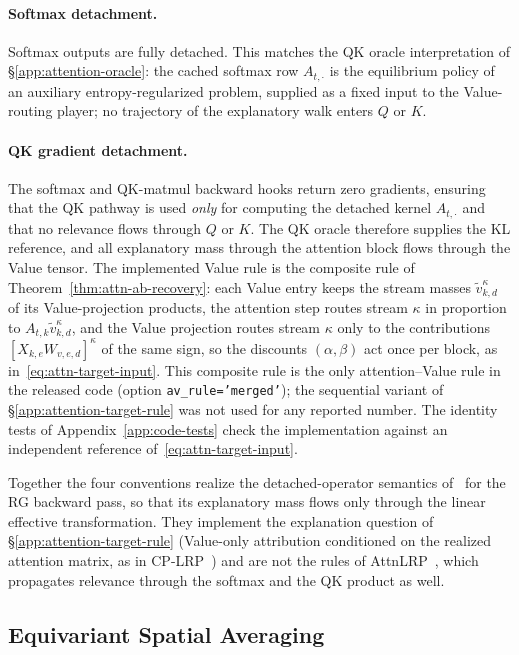 \documentclass[twoside]{article}
\newif\ifch \chfalse
\newcommand{\ch}[1]{\ifch\textcolor{magenta}{#1}\else#1\fi}
\newcommand{\1}{\mathbf{1}}
\begin{document}
\paragraph{Softmax detachment.}
Softmax outputs are fully detached. This matches the QK oracle interpretation of
\S\ref{app:attention-oracle}: the cached softmax row $A_{t,\cdot}$ is the equilibrium policy of an
auxiliary entropy-regularized problem, supplied as a fixed input to the Value-routing player; no
trajectory of the explanatory walk enters $Q$ or $K$.

\paragraph{QK gradient detachment.}\label{app:attention-grad-detach}
The softmax and QK-matmul backward hooks return zero gradients, ensuring that the QK pathway is
used \emph{only} for computing the detached kernel $A_{t,\cdot}$ and that no relevance flows
through $Q$ or $K$. The QK oracle therefore supplies the KL reference, and all explanatory mass
through the attention block flows through the Value tensor. The implemented Value rule is the
composite rule of Theorem~\ref{thm:attn-ab-recovery}: each Value entry keeps the stream masses
$\tilde v^\kappa_{k,d}$ of its Value-projection products, the attention step routes stream $\kappa$
in proportion to $A_{t,k}\tilde v^\kappa_{k,d}$, and the Value projection routes stream $\kappa$
only to the contributions $[X_{k,e}W_{v,e,d}]^\kappa$ of the same sign, so the discounts
$(\alpha,\beta)$ act once per block, as in~\eqref{eq:attn-target-input}. \ch{This composite rule is the
only attention--Value rule in the released code (option \texttt{av\_rule='merged'}); the sequential
variant of \S\ref{app:attention-target-rule} was not used for any reported number. The identity
tests of Appendix~\ref{app:code-tests} check the implementation against an independent reference
of~\eqref{eq:attn-target-input}.}

\ch{Together the four conventions realize the detached-operator semantics of~\citet{Wrobel2024} for the
\ac{RG} backward pass, so that its explanatory mass flows only through the linear effective
transformation. They implement the explanation question of \S\ref{app:attention-target-rule}
(Value-only attribution conditioned on the realized attention matrix, as in
CP-LRP~\citep{Ali2022}) and are not the rules of AttnLRP~\citep{achtibat2024attnlrp}, which
propagates relevance through the softmax and the QK product as well.}

\subsection{Equivariant Spatial Averaging}\label{app:equivariant}
\end{document}
